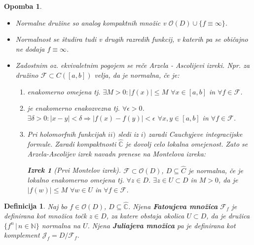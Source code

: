 \documentclass{article}
\newtheorem{definicija}{Definicija}
\newtheorem{opomba}{Opomba}
\newtheorem{izrek}{Izrek}
\newcommand{\C}{\mathbb{C}}
\newcommand{\N}{\mathbb{N}}
\newcommand{\F}{\mathcal{F}}
\newcommand{\Ho}{\mathcal{O}}
\begin{document}
\begin{opomba}
\begin{itemize}
\item Normalne družine so analog kompaktnih množic v $\Ho(D) \cup \{f \equiv \infty\}$. 
\item Normalnost se študira tudi v drugih razredih funkcij, v katerih pa se običajno ne dodaja $f\equiv \infty$.
\item Zadostnim oz. ekvivaletnim pogojem se reče Arzela - Ascolijevi izreki. Npr. za družino $\F \subset C([a, b])$ velja, da je normalna, če je:
\begin{enumerate}
\item[i)] enakomerno omejena tj. $\exists M > 0: |f(x)| \leq M$ $\forall x\in [a, b]$ in $\forall f\in \F$.
\item[ii)] je enakomerno enakozvezna tj. $\forall \epsilon > 0$. $\exists \delta > 0: |x - y| < \delta \Longrightarrow |f(x) - f(y)| < \epsilon$ $\forall x, y\in [a, b]$ in $\forall f\in \F$.
\item[iii)] Pri holomorfnih funkcijah $ii)$ sledi iz $i)$ zaradi Cauchyjeve integracijske formule. Zaradi kompaktnosti $\hat{\C}$ je dovolj celo lokalna omejenost. Zato se Arzela-Ascolijev izrek navadn prenese na Montelova izreka:
\begin{izrek}[Prvi Montelov izrek]
$\F \subset \Ho(D)$, $D\subseteq \hat{C}$ je normalna, če je lokalno enakomerno omejena tj. $\forall z\in D$. $\exists z\in U \subset D $ in $M > 0$, da je $|f(w)| \leq M$ $\forall w\in U$ in $\forall f\in \F$.
\end{izrek}
\end{enumerate}
\end{itemize}
\end{opomba}

\begin{definicija}
Naj bo $f \in \Ho(D)$, $D\subseteq \hat{\C}$. Njena \textbf{Fatoujeva množica} $\F_f$ je definirana kot množica točk $z\in D$, za katere obstaja okolica $U\subset D$, da je družica $\{f^n \,|\, n\in \N\}$ normalna na $U$. Njena \textbf{Juliajeva množica} pa je definirana kot komplement $\mathcal{J}_f = D\slash \F_f$.
\end{definicija}
\end{document}
